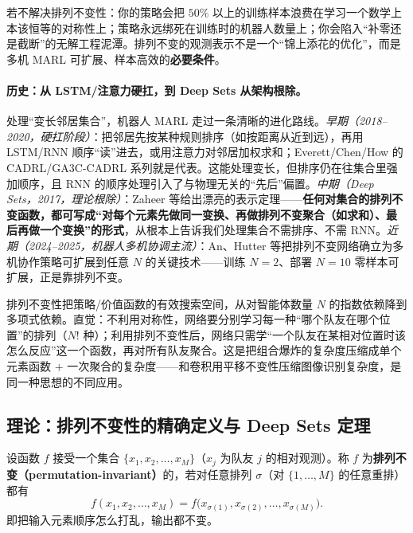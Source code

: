 \begin{insight}
若不解决排列不变性：你的策略会把 $50\%$ 以上的训练样本浪费在学习一个数学上本该恒等的对称性上；策略永远绑死在训练时的机器人数量上；你会陷入“补零还是截断”的无解工程泥潭。排列不变的观测表示不是一个“锦上添花的优化”，而是多机 MARL 可扩展、样本高效的\textbf{必要条件}。
\end{insight}

\paragraph{历史：从 LSTM/注意力硬扛，到 Deep Sets 从架构根除。}
处理“变长邻居集合”，机器人 MARL 走过一条清晰的进化路线。\emph{早期（2018--2020，硬扛阶段）}：把邻居先按某种规则排序（如按距离从近到远），再用 LSTM/RNN 顺序“读”进去，或用注意力对邻居加权求和；Everett/Chen/How 的 CADRL/GA3C-CADRL 系列就是代表\cite{everett2018cadrl}。这能处理变长，但排序仍在往集合里强加顺序，且 RNN 的顺序处理引入了与物理无关的“先后”偏置。\emph{中期（Deep Sets，2017，理论根除）}：Zaheer 等给出漂亮的表示定理\cite{zaheer2017deepsets}——\textbf{任何对集合的排列不变函数，都可写成“对每个元素先做同一变换、再做排列不变聚合（如求和）、最后再做一个变换”的形式}，从根本上告诉我们处理集合不需排序、不需 RNN。\emph{近期（2024--2025，机器人多机协调主流）}：An、Hutter 等把排列不变网络确立为多机协作策略可扩展到任意 $N$ 的关键技术\cite{an2024perminv}——训练 $N{=}2$、部署 $N{=}10$ 零样本可扩展，正是靠排列不变。

\begin{insight}[排列不变把搜索空间从指数压到多项式]
排列不变性把策略/价值函数的有效搜索空间，从对智能体数量 $N$ 的指数依赖降到多项式依赖。直觉：不利用对称性，网络要分别学习每一种“哪个队友在哪个位置”的排列（$N!$ 种）；利用排列不变性后，网络只需学“一个队友在某相对位置时该怎么反应”这一个函数，再对所有队友聚合。这是把组合爆炸的复杂度压缩成单个元素函数 $+$ 一次聚合的复杂度——和卷积用平移不变性压缩图像识别复杂度，是同一种思想的不同应用。
\end{insight}

\subsection{理论：排列不变性的精确定义与 Deep Sets 定理}
\label{sec:mc-deepsets}

\begin{definition}[排列不变函数]\label{def:mc-perm-inv}
设函数 $f$ 接受一个集合 $\{x_1,x_2,\dots,x_M\}$（$x_j$ 为队友 $j$ 的相对观测）。称 $f$ 为\textbf{排列不变（permutation-invariant）}的，若对任意排列 $\sigma$（对 $\{1,\dots,M\}$ 的任意重排）都有
\begin{equation}
  f(x_1,x_2,\dots,x_M)=f\big(x_{\sigma(1)},x_{\sigma(2)},\dots,x_{\sigma(M)}\big).
  \label{eq:mc-perm-inv}
\end{equation}
即把输入元素顺序怎么打乱，输出都不变。
\end{definition}

